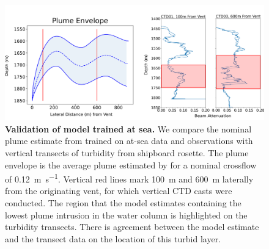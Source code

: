 \begin{figure}[h!]
    \centering
    \includegraphics[width=1\columnwidth]{figures/field_validation.png}
    \caption{\textbf{Validation of \PHUMES model trained at sea.} We compare the nominal plume estimate from \PHUMES trained on at-sea data and \Sentry observations with vertical transects of turbidity from shipboard rosette. The plume envelope is the average plume estimated by \PHUMES for a nominal crossflow of \SI{0.12}{\meter\per\second}. Vertical red lines mark \SI{100}{\meter} and \SI{600}{\meter} laterally from the originating vent, for which vertical CTD casts were conducted. The region that the model estimates containing the lowest plume intrusion in the water column is highlighted on the turbidity transects. There is agreement between the model estimate and the transect data on the location of this turbid layer.} 
    \label{fig:field_valid}
\end{figure}



